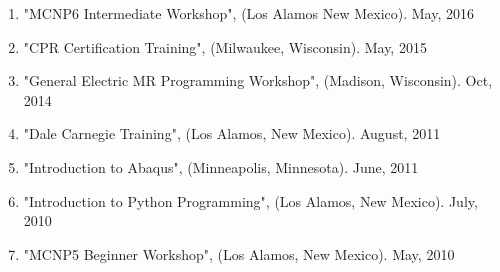 \normalsize
{}
\begin{enumerate}[itemsep=2mm,label=\Roman*]
	\item "MCNP6 Intermediate Workshop", (Los Alamos New Mexico). May, 2016
	\item "CPR Certification Training", (Milwaukee, Wisconsin). May, 2015
	\item "General Electric MR Programming Workshop", (Madison, Wisconsin). Oct, 2014
	\item "Dale Carnegie Training", (Los Alamos, New Mexico). August, 2011
	\item "Introduction to Abaqus", (Minneapolis, Minnesota). June, 2011
	\item "Introduction to Python Programming", (Los Alamos, New Mexico). July, 2010
	\item "MCNP5 Beginner Workshop", (Los Alamos, New Mexico). May, 2010
\end{enumerate}

